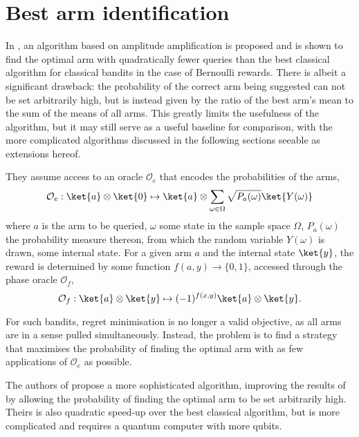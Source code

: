 \section{Best arm identification}
In \autocite{casale2020}, an algorithm based on amplitude amplification is proposed and is shown to find the optimal arm with quadratically fewer queries than the best classical algorithm for classical bandits in the case of Bernoulli rewards.
There is albeit a significant drawback: the probability of the correct arm being suggested can not be set arbitrarily high, but is instead given by the ratio of the best arm's mean to the sum of the means of all arms.
This greatly limits the usefulness of the algorithm, but it may still serve as a useful baseline for comparison, with the more complicated algorithms discussed in the following sections seeable as extensions hereof.

They assume access to an oracle $\mathcal{O}_e$ that encodes the probabilities of the arms,
\begin{equation}
    \mathcal{O}_e: \ket{a} \otimes \ket{0} \mapsto \ket{a} \otimes \sum_{\omega \in \Omega} \sqrt{P_a(\omega)} \ket{Y(\omega)}
\end{equation}
where $a$ is the arm to be queried, $\omega$ some state in the sample space $\Omega$, $P_a(\omega)$ the probability measure thereon, from which the random variable $Y(\omega)$ is drawn, some internal state.
For a given arm $a$ and the internal state $\ket{y}$, the reward is determined by some function $f(a, y) \to \{0, 1\}$, accessed through the phase oracle $\mathcal{O}_f$,
\begin{equation}
    \mathcal{O}_f :  \ket{a}\otimes\ket{y} \mapsto (-1)^{f(x,y)} \ket{a}\otimes\ket{y}.
\end{equation}

For such bandits, regret minimisation is no longer a valid objective, as all arms are in a sense pulled simultaneously.
Instead, the problem is to find a strategy that maximises the probability of finding the optimal arm with as few applications of $\mathcal{O}_e$ as possible.

The authors of \autocite{wang2021} propose a more sophisticated algorithm, improving the results of \autocite{casale2020} by allowing the probability of finding the optimal arm to be set arbitrarily high.
Theirs is also quadratic speed-up over the best classical algorithm, but is more complicated and requires a quantum computer with more qubits.